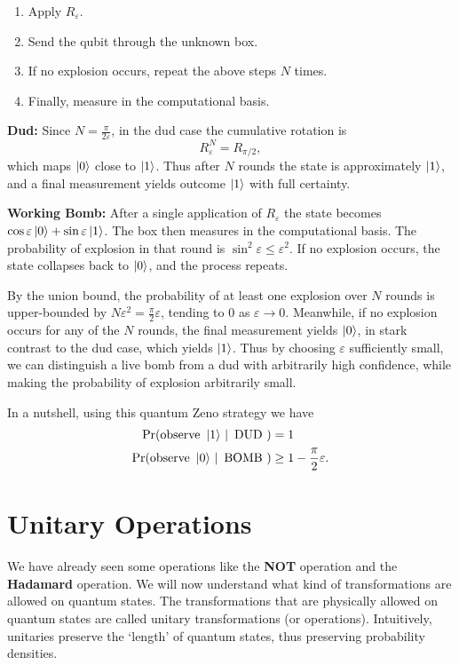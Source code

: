 \begin{enumerate}
    \item Apply $R_\varepsilon$.
    \item Send the qubit through the unknown box.
    \item If no explosion occurs, repeat the above steps $N$ times.
    \item Finally, measure in the computational basis.
\end{enumerate}

\textbf{Dud:} Since $N=\frac{\pi}{2\varepsilon}$, in the dud case the cumulative rotation is
\[
R_\varepsilon^N = R_{\pi/2},
\]
which maps $\ket{0}$ close to $\ket{1}$. Thus after $N$ rounds the state is approximately $\ket{1}$, and a final measurement yields outcome $\ket{1}$ with full certainty.

\textbf{Working Bomb:} After a single application of $R_\varepsilon$ the state becomes $\cos\varepsilon\ket{0}+\sin\varepsilon\ket{1}$. The box then measures in the computational basis. The probability of explosion in that round is $\sin^2\varepsilon \leq \varepsilon^2$. If no explosion occurs, the state collapses back to $\ket{0}$, and the process repeats.

By the union bound, the probability of at least one explosion over $N$ rounds is upper-bounded by $N\varepsilon^2=\frac{\pi}{2}\varepsilon$, tending to $0$ as $\varepsilon \to 0$. Meanwhile, if no explosion occurs for any of the $N$ rounds, the final measurement yields $\ket{0}$, in stark contrast to the dud case, which yields $\ket{1}$. Thus by choosing $\varepsilon$ sufficiently small, we can distinguish a live bomb from a dud
with arbitrarily high confidence, while making the probability of explosion arbitrarily small.

In a nutshell, using this quantum Zeno strategy we have
\begin{align*}
    \Pr(\text{observe } \ket{1}\,|\,\text{ DUD }) &= 1\\
    \Pr(\text{observe } \ket{0}\,|\,\text{ BOMB }) &\geq 1 - \frac{\pi}{2}\varepsilon.
\end{align*}


\section{Unitary Operations}
We have already seen some operations like the \textbf{NOT} operation and the \textbf{Hadamard} operation. We will now understand what kind of transformations are allowed on quantum states. The transformations that are physically allowed on quantum states are called unitary transformations (or operations). Intuitively, unitaries preserve the `length' of quantum states, thus preserving probability densities.

